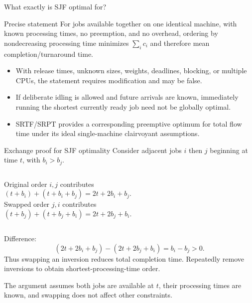 \documentclass[aspectratio=169,11pt]{beamer}
\begin{document}
\begin{frame}{What exactly is SJF optimal for?}
  \begin{alertblock}{Precise statement}
    For jobs available together on one identical machine, with known processing times, no preemption, and no overhead, ordering by nondecreasing processing time minimizes $\sum_i c_i$ and therefore mean completion/turnaround time.
  \end{alertblock}
  \begin{itemize}
    \item With release times, unknown sizes, weights, deadlines, blocking, or multiple CPUs, the statement requires modification and may be false.
    \item If deliberate idling is allowed and future arrivals are known, immediately running the shortest currently ready job need not be globally optimal.
    \item SRTF/SRPT provides a corresponding preemptive optimum for total flow time under its ideal single-machine clairvoyant assumptions.
  \end{itemize}
\end{frame}

\begin{frame}{Exchange proof for SJF optimality}
  Consider adjacent jobs $i$ then $j$ beginning at time $t$, with $b_i>b_j$.
  \begin{columns}[T,onlytextwidth]
      Original order $i,j$ contributes
      \[
        (t+b_i)+(t+b_i+b_j)
        =2t+2b_i+b_j.
      \]
      Swapped order $j,i$ contributes
      \[
        (t+b_j)+(t+b_j+b_i)
        =2t+2b_j+b_i.
      \]
  \end{columns}
  Difference:
  \[
    (2t+2b_i+b_j)-(2t+2b_j+b_i)=b_i-b_j>0.
  \]
  Thus swapping an inversion reduces total completion time. Repeatedly remove inversions to obtain shortest-processing-time order.
  \begin{tcolorbox}[title=Proof boundary]
    The argument assumes both jobs are available at $t$, their processing times are known, and swapping does not affect other constraints.
  \end{tcolorbox}
\end{frame}
\end{document}
